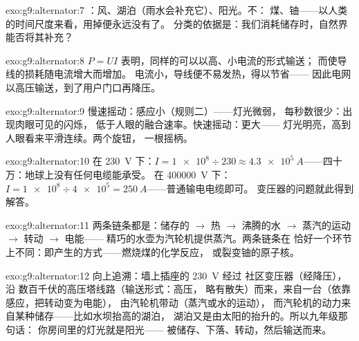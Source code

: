 \begin{solution}{exo:g9:alternator:7}
：风、湖泊（雨水会补充它）、阳光。不：
煤、铀——以人类的时间尺度来看，用掉便永远没有了。
分类的依据是：我们消耗储存时，自然界能否将其补充？
\end{solution}

\begin{solution}{exo:g9:alternator:8}
$P = U I$ 表明，同样的可以以高、小电流的形式输送；
而使导线的损耗随电流增大而增加。
电流小，导线便不易发热，得以节省——
因此电网以高压输送，到了用户门口再降压。
\end{solution}

\begin{solution}{exo:g9:alternator:9}
慢速摇动：感应小（规则二）——灯光微弱，
每秒数很少：出现肉眼可见的闪烁，
低于人眼的融合速率。快速摇动：更大——
灯光明亮，高到人眼看来平滑连续。两个旋钮，
一根摇柄。
\end{solution}

\begin{solution}{exo:g9:alternator:10}
在 \qty{230}{V} 下：$I = \num{1e8} \div 230 \approx
\qty{4.3e5}{A}$——四十万：地球上没有任何电缆能承受。
在 \qty{400000}{V} 下：$I = \num{1e8} \div
\num{4e5} = \qty{250}{A}$——普通输电电缆即可。
变压器的问题就此得到解答。
\end{solution}

\begin{solution}{exo:g9:alternator:11}
两条链条都是：储存的 $\to$ 热 $\to$ 沸腾的水
$\to$ 蒸汽的运动 $\to$ 转动 $\to$ 电能——
精巧的水壶为汽轮机提供蒸汽。两条链条在
恰好一个环节上不同：即产生的方式——燃烧煤的化学反应，
或裂变铀的原子核。
\end{solution}

\begin{solution}{exo:g9:alternator:12}
向上追溯：墙上插座的 \qty{230}{V} 经过
社区变压器（经降压），沿
数百千伏的高压塔线路（输送形式：高压，
略有散失）而来，来自一台（依靠感应，把转动变为电能），
由汽轮机带动（蒸汽或水的运动），
而汽轮机的动力来自某种储存——比如水坝抬高的湖泊，
湖泊又是由太阳的抬升的。所以九年级那句话：
你房间里的灯光就是阳光——
被储存、下落、转动，然后输送而来。
\end{solution}

